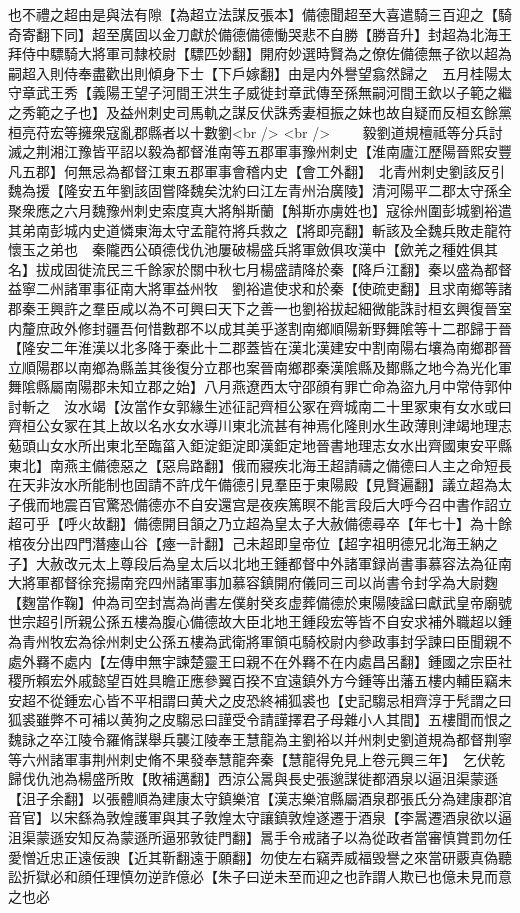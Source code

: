 也不禮之超由是與法有隙【為超立法謀反張本】備德聞超至大喜遣騎三百迎之【騎奇寄翻下同】超至廣固以金刀獻於備德備德慟哭悲不自勝【勝音升】封超為北海王拜侍中驃騎大將軍司隸校尉【驃匹妙翻】開府妙選時賢為之僚佐備德無子欲以超為嗣超入則侍奉盡歡出則傾身下士【下戶嫁翻】由是内外譽望翕然歸之　五月桂陽太守章武王秀【義陽王望子河間王洪生子威徙封章武傳至孫無嗣河間王欽以子範之繼之秀範之子也】及益州刺史司馬軌之謀反伏誅秀妻桓振之妹也故自疑而反桓玄餘黨桓亮苻宏等擁衆寇亂郡縣者以十數劉<br />
<br />
　　毅劉道規檀祗等分兵討滅之荆湘江豫皆平詔以毅為都督淮南等五郡軍事豫州刺史【淮南廬江歷陽晉熙安豐凡五郡】何無忌為都督江東五郡軍事會稽内史【會工外翻】　北青州刺史劉該反引魏為援【隆安五年劉該固嘗降魏矣沈約曰江左青州治廣陵】清河陽平二郡太守孫全聚衆應之六月魏豫州刺史索度真大將斛斯蘭【斛斯亦虜姓也】寇徐州圍彭城劉裕遣其弟南彭城内史道憐東海太守孟龍符將兵救之【將即亮翻】斬該及全魏兵敗走龍符懷玉之弟也　秦隴西公碩德伐仇池屢破楊盛兵將軍斂俱攻漢中【歛羌之種姓俱其名】拔成固徙流民三千餘家於關中秋七月楊盛請降於秦【降戶江翻】秦以盛為都督益寧二州諸軍事征南大將軍益州牧　劉裕遣使求和於秦【使疏吏翻】且求南鄉等諸郡秦王興許之羣臣咸以為不可興曰天下之善一也劉裕拔起細微能誅討桓玄興復晉室内釐庶政外修封疆吾何惜數郡不以成其美乎遂割南鄉順陽新野舞隂等十二郡歸于晉【隆安二年淮漢以北多降于秦此十二郡蓋皆在漢北漢建安中割南陽右壤為南鄉郡晉立順陽郡以南鄉為縣盖其後復分立郡也案晉南鄉郡秦漢隂縣及鄼縣之地今為光化軍舞隂縣屬南陽郡未知立郡之始】八月燕遼西太守邵顔有罪亡命為盜九月中常侍郭仲討斬之　汝水竭【汝當作女郭緣生述征記齊桓公冢在齊城南二十里冢東有女水或曰齊桓公女冢在其上故以名水女水導川東北流甚有神焉化隆則水生政薄則津竭地理志葂頭山女水所出東北至臨菑入鉅淀鉅淀即漢鉅定地晉書地理志女水出齊國東安平縣東北】南燕主備德惡之【惡烏路翻】俄而寢疾北海王超請禱之備德曰人主之命短長在天非汝水所能制也固請不許戊午備德引見羣臣于東陽殿【見賢遍翻】議立超為太子俄而地震百官驚恐備德亦不自安還宫是夜疾篤瞑不能言段后大呼今召中書作詔立超可乎【呼火故翻】備德開目頷之乃立超為皇太子大赦備德尋卒【年七十】為十餘棺夜分出四門潛瘞山谷【瘞一計翻】己未超即皇帝位【超字祖明德兄北海王納之子】大赦改元太上尊段后為皇太后以北地王鍾都督中外諸軍録尚書事慕容法為征南大將軍都督徐兖揚南兖四州諸軍事加慕容鎮開府儀同三司以尚書令封孚為大尉麴【麴當作鞠】仲為司空封嵩為尚書左僕射癸亥虚葬備德於東陽陵諡曰獻武皇帝廟號世宗超引所親公孫五樓為腹心備德故大臣北地王鍾段宏等皆不自安求補外職超以鍾為青州牧宏為徐州刺史公孫五樓為武衛將軍領屯騎校尉内參政事封孚諫曰臣聞親不處外羇不處内【左傳申無宇諫楚靈王曰親不在外羇不在内處昌呂翻】鍾國之宗臣社稷所賴宏外戚懿望百姓具瞻正應參翼百揆不宜遠鎮外方今鍾等出藩五樓内輔臣竊未安超不從鍾宏心皆不平相謂曰黄犬之皮恐終補狐裘也【史記騶忌相齊淳于髠謂之曰狐裘雖弊不可補以黄狗之皮騶忌曰謹受令請謹擇君子母雜小人其間】五樓聞而恨之　魏詠之卒江陵令羅脩謀舉兵襲江陵奉王慧龍為主劉裕以并州刺史劉道規為都督荆寧等六州諸軍事荆州刺史脩不果發奉慧龍奔秦【慧龍得免見上卷元興三年】　乞伏乾歸伐仇池為楊盛所敗【敗補邁翻】西涼公暠與長史張邈謀徙都酒泉以逼沮渠蒙遜【沮子余翻】以張體順為建康太守鎮樂涫【漢志樂涫縣屬酒泉郡張氏分為建康郡涫音官】以宋繇為敦煌護軍與其子敦煌太守讓鎮敦煌遂遷于酒泉【李暠遷酒泉欲以逼沮渠蒙遜安知反為蒙遜所逼邪敦徒門翻】暠手令戒諸子以為從政者當審慎賞罰勿任愛憎近忠正遠佞諛【近其靳翻遠于願翻】勿使左右竊弄威福毁譽之來當研覈真偽聽訟折獄必和顔任理慎勿逆詐億必【朱子曰逆未至而迎之也詐謂人欺已也億未見而意之也必